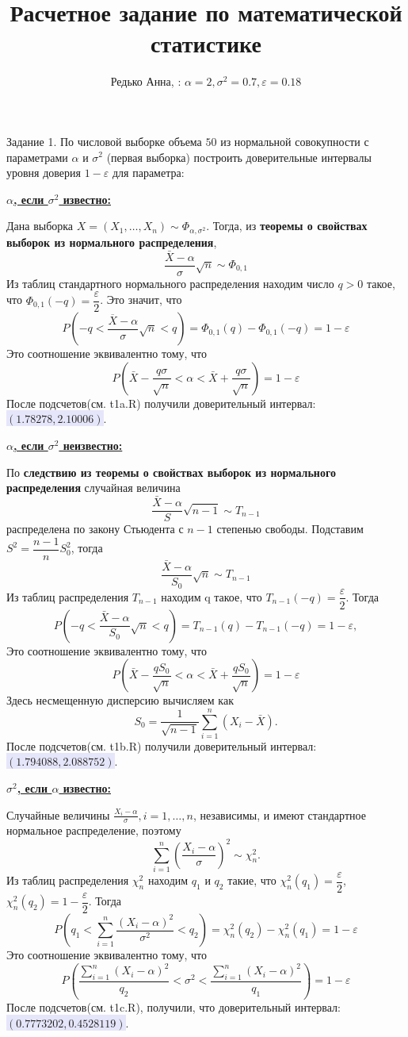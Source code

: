 \documentclass{article}
\title{Расчетное задание по математической статистике}
\author{Редько Анна, \bfвыборка 18: $\alpha = 2, \sigma^2 = 0.7, \varepsilon = 0.18$}
\begin{document}
\maketitle

\colorbox{light-gray}{Задание 1.}
По числовой выборке объема $50$ из нормальной совокупности с параметрами $\alpha$ и $\sigma^2$ (первая выборка) построить доверительные интервалы уровня доверия $1 - \varepsilon$ для параметра:

\underline{\bf $\alpha$, если $\sigma^2$ известно:}

Дана выборка $X = (X_1, \dots, X_n) \sim \Phi_{\alpha, \sigma^2}$. Тогда, из {\bf теоремы о свойствах выборок из нормального распределения}, 
\[\frac{\bar X - \alpha}\sigma \sqrt n \sim \Phi_{0, 1}\]
Из таблиц стандартного нормального распределения находим число $q > 0$ такое, что $\Phi_{0,1}(-q) = \dfrac{\varepsilon}{2}$. Это значит, что 
\[ P\left(-q < \frac{\overline{X} - \alpha}\sigma \sqrt n < q \right) = \Phi_{0,1}(q) - \Phi_{0,1}(-q) = 1 - \varepsilon \]
Это соотношение эквивалентно тому, что 
\[ P\left(\bar X - \dfrac{q\sigma}{\sqrt{n}} < \alpha < \bar X + \dfrac{q\sigma}{\sqrt{n}} \right) = 1 - \varepsilon\]
После подсчетов(см. t1a.R) получили доверительный интервал: 
\colorbox{Lavender}{$(1.78278, 2.10006)$}.

\underline{\bf $\alpha$, если $\sigma^2$ неизвестно:}

По {\bf следствию из теоремы о свойствах выборок из нормального распределения} случайная величина  
\[\frac{\bar X - \alpha}{S} \sqrt {n-1} \sim T_{n-1}\]
распределена по закону Стьюдента с $n-1$ степенью свободы. Подставим $S^2 = \dfrac{n - 1}{n}S_0^2$, тогда 
\[\frac{\bar X - \alpha}{S_0} \sqrt {n} \sim T_{n-1}\]
Из таблиц распределения $T_{n-1}$ находим q такое, что $T_{n-1}(-q) = \dfrac{\varepsilon}{2}.$
Тогда 
\[P\left(-q < \frac{\bar X - \alpha}{S_0} \sqrt {n} < q\right) = T_{n-1}(q) - T_{n-1}(-q) = 1 - \varepsilon, \]
Это соотношение эквивалентно тому, что
\[P \left( \bar X - \dfrac{q S_0}{\sqrt{n}} < \alpha < \bar X + \dfrac{q S_0}{\sqrt{n}}  \right) = 1 - \varepsilon\]
Здесь несмещенную дисперсию вычисляем как 
\[S_0 = \dfrac{1}{\sqrt{n - 1}} \sum_{i=1}^n \left(X_i - \bar X \right).\]
После подсчетов(см. t1b.R) получили доверительный интервал: 
\colorbox{Lavender}{$(1.794088, 2.088752)$}.

\underline{\bf $\sigma^2$, если $\alpha$ известно:}

Случайные величины 
$\frac{X_i - \alpha}\sigma, i = 1, \dots, n$, независимы, и имеют стандартное нормальное распределение, поэтому 
\[\sum_{i=1}^n \left(\dfrac{X_i - \alpha}{\sigma}\right)^2 \sim \chi_n^2.\]
Из таблиц распределения $\chi_n^2$ находим $q_1$ и $q_2$ такие, что $\chi_n^2(q_1) = \dfrac{\varepsilon}{2}$, $\chi_n^2(q_2) = 1 - \dfrac{\varepsilon}{2}$. Тогда 
\[P\left(q_1 < \sum_{i=1}^n \dfrac{(X_i - \alpha)^2}{\sigma^2} < q_2 \right) =  \chi_n^2(q_2) - \chi_n^2(q_1) = 1 - \varepsilon\]
Это соотношение эквивалентно тому, что
\[P\left(  \dfrac{\sum_{i=1}^n(X_i - \alpha)^2}{q_2} < \sigma^2 < \dfrac{\sum_{i=1}^n(X_i - \alpha)^2}{q_1} \right) = 1 - \varepsilon\]
После подсчетов(см. t1c.R), получили, что доверительный интервал: 
\colorbox{Lavender}{$(0.7773202, 0.4528119)$}.
\end{document}
